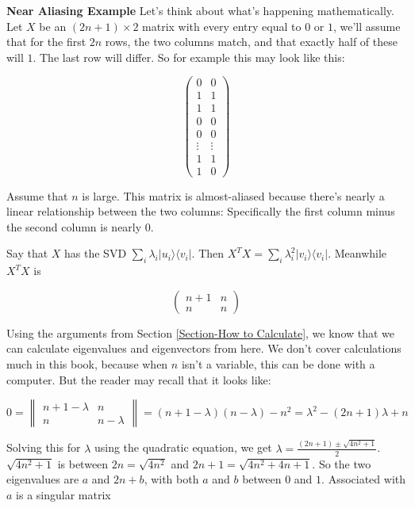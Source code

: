 \documentclass{amsbook}
\begin{document}
\begin{tcolorbox}[title=Example,colback=blue!5]
  {\bfseries\Large Near Aliasing Example}
Let's think about what's happening mathematically.  Let $X$ be an $(2n+1)\times2$ matrix with every entry equal to $0$ or $1$, we'll assume that for the first $2n$ rows, the two columns match, and that exactly half of these will $1$.  The last row will differ.  So for example this may look like this:

$$
\left(\begin{array}{cc}
  0&0\\1&1\\1&1\\0&0\\0&0\\
  \vdots &\vdots\\1&1\\
  1&0
\end{array}\right)
$$

Assume that $n$ is large.  This matrix is almost-aliased because there's nearly a linear relationship between the two columns:  Specifically the first column minus the second column is nearly $0$.

Say that $X$ has the SVD $\sum_i\lambda_i|u_i\rangle\langle v_i|$.  Then $X^TX=\sum_i\lambda_i^2|v_i\rangle\langle v_i|$.  Meanwhile $X^TX$ is

$$
\left(\begin{array}{cc}n+1&n\\n&n\end{array}\right)
$$

Using the arguments from Section \ref{Section-How to Calculate}, we know that we can calculate eigenvalues and eigenvectors from here.  We don't cover calculations much in this book, because when $n$ isn't a variable, this can be done with a computer.  But the reader may recall that it looks like:

$$
0=\left\|\begin{array}{cc}n+1-\lambda&n\\n&n-\lambda\end{array}\right\|=(n+1-\lambda)(n-\lambda)-n^2=\lambda^2-(2n+1)\lambda+n
$$

Solving this for $\lambda$ using the quadratic equation, we get $\lambda=\frac{(2n+1)\pm\sqrt{4n^2+1}}{2}$.  $\sqrt{4n^2+1}$ is between $2n=\sqrt{4n^2}$ and $2n+1=\sqrt{4n^2+4n+1}$.  So the two eigenvalues are $a$ and $2n+b$, with both $a$ and $b$ between $0$ and $1$.  Associated with $a$ is a singular matrix 


\end{tcolorbox}
\end{document}
